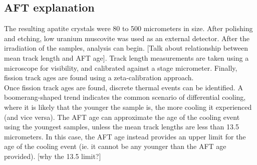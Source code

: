 \documentclass[11pt, oneside]{article}   	%
\begin{document}
\subsection{AFT explanation}
The resulting apatite crystals were 80 to 500 micrometers in size. After polishing and etching, low uranium muscovite was used as an external detector. After the irradiation of the samples, analysis can begin. [Talk about relationship between mean track length and AFT age]. Track length measurements are taken using a microscope for visibility, and calibrated against a stage micrometer. Finally, fission track ages are found using a zeta-calibration approach. 
\\Once fission track ages are found, discrete thermal events can be identified. A boomerang-shaped trend indicates the common scenario of differential cooling, where it is likely that the younger the sample is, the more cooling it experienced (and vice versa). The AFT age can approximate the age of the cooling event using the youngest samples, unless the mean track lengths are less than 13.5 micrometers. In this case, the AFT age instead provides an upper limit for the age of the cooling event (ie. it cannot be any younger than the AFT age provided). [why the 13.5 limit?]
\end{document}
